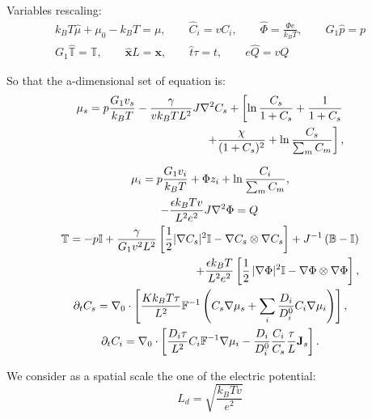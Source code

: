 Variables rescaling:
\begin{equation*}
\begin{aligned}
k_BT\hat{\mu} + \mu_0 -k_BT= \mu, \qquad \hat{C}_i = vC_i, \qquad \hat{\Phi} = \frac{\Phi e}{k_B T}, \qquad  G_1\hat{p}= p\\
G_1\hat{\mathbb{T}}=\mathbb{T}, \qquad\hat{\mathbf{x}} L =\mathbf{x}, \qquad \hat{t}\tau=t, \qquad e\hat{Q} =v Q
\end{aligned}
\end{equation*}

So that the a-dimensional set of equation is:
\begin{gather}
\begin{aligned}
\mu_s = p \frac{G_1v_s}{k_BT} - \frac{\gamma}{vk_BT L^2} J \nabla^2 C_s + \left[\ln \frac{C_s}{1+C_s} + \frac{1}{1+C_s}\right.\\
\left.\ \ \ \ \ \ +\frac{\chi}{(1+C_s)^2} + \ln \frac{C_s}{\sum_m C_m} \right], 
\end{aligned}\\[2.5mm]
\mu_i = p \frac{G_1v_i}{k_BT} + \Phi z_i + \ln \frac{C_i}{\sum_m C_m} ,\\
-\frac{\epsilon k_B Tv}{L^2e^2} J \nabla^2 \Phi = Q\, \\
\begin{aligned}
\mathbb{T}= -p \mathbb{I} +\frac{\gamma }{G_1v^2L^2} \left[\frac{1}{2} |\nabla C_s|^2\mathbb{I} - \nabla C_s \otimes \nabla C_s\right]+ J^{-1}\left(\mathbb{B}-\mathbb{I}\right)\\
+ \frac{\epsilon k_BT}{L^2e^2} \left[\frac{1}{2} \,|\nabla \Phi|^2\mathbb{I} -\nabla \Phi \otimes \nabla \Phi\right],
\end{aligned}\\
\partial_t C_s=\nabla_0 \cdot\left[\frac{K k_B T\tau}{L^2}  \mathbb{F}^{-1}\left(C_s\nabla \mu_s +\sum_i \frac{D_i}{D^0_i} C_i \nabla \mu_i\right)\right],\\
\partial_t C_i= \nabla_0\cdot\left[\frac{D_i\tau}{L^2}C_i\mathbb{F}^{-1}\nabla \mu_i -\frac{D_i}{D^0_i} \frac{C_i}{C_s} \frac{\tau}{L}\mathbf{J}_s\right].
\end{gather}

We consider as a spatial scale the one of the electric potential:
\begin{equation}
L_d=\sqrt{\frac{k_BTv}{e^2}}
\end{equation}

